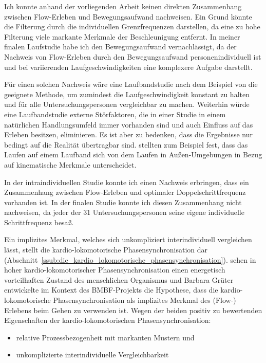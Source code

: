 Ich konnte anhand der vorliegenden Arbeit keinen direkten Zusammenhang zwischen Flow-Erleben und Bewegungsaufwand nachweisen. Ein Grund könnte die Filterung durch die individuellen Grenzfrequenzen darstellen, da eine zu hohe Filterung viele markante Merkmale der Beschleunigung entfernt. In meiner finalen Laufstudie habe ich den Bewegungsaufwand vernachlässigt, da der Nachweis von Flow-Erleben durch den Bewegungsaufwand personenindividuell ist und bei variierenden Laufgeschwindigkeiten eine komplexere Aufgabe darstellt.

Für einen solchen Nachweis wäre eine Laufbandstudie nach dem Beispiel von \citet{Reinhardt2006} die geeignete Methode, um zumindest die Laufgeschwindigkeit konstant zu halten und für alle Untersuchungspersonen vergleichbar zu machen. Weiterhin würde eine Laufbandstudie externe Störfaktoren, die in einer Studie in einem natürlichen Handlungsumfeld immer vorhanden sind und auch Einfluss auf das Erleben besitzen, eliminieren. Es ist aber zu bedenken, dass die Ergebnisse nur bedingt auf die Realität übertragbar sind. \citet{Strohrmann2012} stellten zum Beispiel fest, dass das Laufen auf einem Laufband sich von dem Laufen in Außen-Umgebungen in Bezug auf kinematische Merkmale unterscheidet. 

In der intraindividuellen Studie konnte ich einen Nachweis erbringen, dass ein Zusammenhang zwischen Flow-Erleben und optimaler Doppelschrittfrequenz vorhanden ist. In der finalen Studie konnte ich diesen Zusammenhang nicht nachweisen, da jeder der 31 Untersuchungspersonen seine eigene individuelle Schrittfrequenz besaß. 

Ein implizites Merkmal, welches sich unkompliziert interindividuell vergleichen lässt, stellt die kardio-lokomotorische Phasensynchronisation dar (Abschnitt~\ref{ssub:die_kardio_lokomotorische_phasensynchronisation}). \citet[][S.~18]{Niizeki2014} sehen in hoher kardio-lokomotorischer Phasensynchronisation einen energetisch vorteilhaften Zustand des menschlichen Organismus und Barbara Grüter entwickelte im Kontext des \acs{BMBF}-Projekts die Hypothese, dass die kardio-lokomotorische Phasensynchronisation als implizites Merkmal des (Flow-) Erlebens beim Gehen zu verwenden ist. Wegen der beiden positiv zu bewertenden Eigenschaften der kardio-lokomotorischen Phasensynchronisation: 
\begin{itemize}
	
	\item relative Prozessbezogenheit mit markanten Mustern und
	
	\item unkomplizierte interindividuelle Vergleichbarkeit 
\end{itemize}

